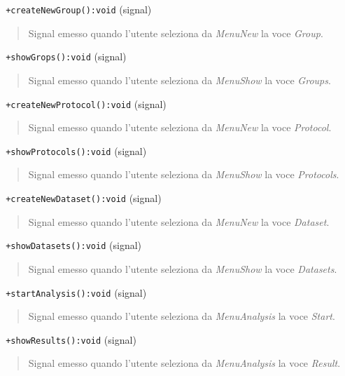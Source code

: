 \color{blue}\verb! +createNewGroup():void! (signal)
\color{black} 
\begin{quote}
Signal\g{} emesso quando l'utente seleziona da \emph{MenuNew} la voce \emph{Group}.
\end{quote}
\color{blue}\verb! +showGrops():void! (signal)
\color{black} 
\begin{quote}
Signal\g{} emesso quando l'utente seleziona da \emph{MenuShow} la voce \emph{Groups}.
\end{quote}

\color{blue}\verb! +createNewProtocol():void! (signal)
\color{black} 
\begin{quote}
Signal\g{} emesso quando l'utente seleziona da \emph{MenuNew} la voce \emph{Protocol}.
\end{quote}
\color{blue}\verb! +showProtocols():void! (signal)
\color{black} 
\begin{quote}
Signal\g{} emesso quando l'utente seleziona da \emph{MenuShow} la voce \emph{Protocols}.
\end{quote}

\color{blue}\verb! +createNewDataset():void! (signal)
\color{black} 
\begin{quote}
Signal\g{} emesso quando l'utente seleziona da \emph{MenuNew} la voce \emph{Dataset}.
\end{quote}
\color{blue}\verb! +showDatasets():void! (signal)
\color{black} 
\begin{quote}
Signal\g{} emesso quando l'utente seleziona da \emph{MenuShow} la voce \emph{Datasets}.
\end{quote}


\color{blue}\verb! +startAnalysis():void! (signal)
\color{black} 
\begin{quote}
Signal\g{} emesso quando l'utente seleziona da \emph{MenuAnalysis} la voce \emph{Start}.
\end{quote}
\color{blue}\verb! +showResults():void! (signal)
\color{black} 
\begin{quote}
Signal\g{} emesso quando l'utente seleziona da \emph{MenuAnalysis} la voce \emph{Result}.
\end{quote}